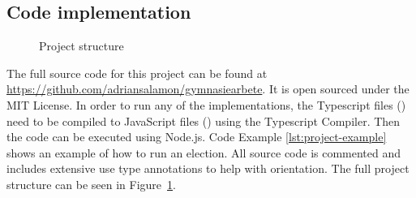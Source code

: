 \documentclass[12pt]{article}
\begin{document}
\printbibliography[
heading=bibintoc,
title={References}
]
\pagebreak
\begin{appendices}
\section{Code implementation}
\label{sec:conde implementation}
\begin{figure}[H]
\caption{Project structure}
\label{fig:project-structure}
\end{figure}
The full source code for this project can be found at \url{https://github.com/adriansalamon/gymnasiearbete}. It is open sourced under the MIT License. In order to run any of the implementations, the Typescript files () need to be compiled to JavaScript files () using the Typescript Compiler. Then the code can be executed using Node.js. Code Example \ref{lst:project-example} shows an example of how to run an election.
All source code is commented and includes extensive use type annotations to help with orientation. The full project structure can be seen in Figure~\ref{fig:project-structure}.


\end{appendices}
\end{document}
